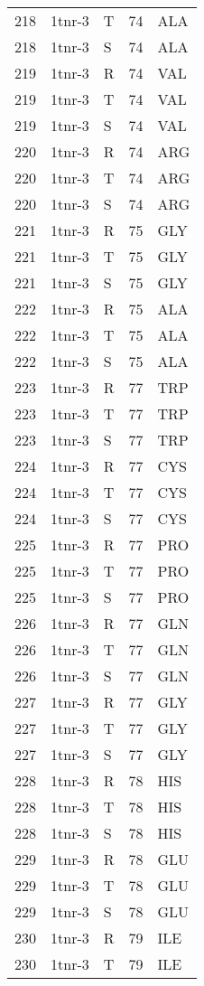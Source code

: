 \begin{longtable}[l]{l|l|l|l|l}
	218 & 1tnr-3 & T & 74 & ALA \\
	218 & 1tnr-3 & S & 74 & ALA \\
	219 & 1tnr-3 & R & 74 & VAL \\
	219 & 1tnr-3 & T & 74 & VAL \\
	219 & 1tnr-3 & S & 74 & VAL \\
	220 & 1tnr-3 & R & 74 & ARG \\
	220 & 1tnr-3 & T & 74 & ARG \\
	220 & 1tnr-3 & S & 74 & ARG \\
	221 & 1tnr-3 & R & 75 & GLY \\
	221 & 1tnr-3 & T & 75 & GLY \\
	221 & 1tnr-3 & S & 75 & GLY \\
	222 & 1tnr-3 & R & 75 & ALA \\
	222 & 1tnr-3 & T & 75 & ALA \\
	222 & 1tnr-3 & S & 75 & ALA \\
	223 & 1tnr-3 & R & 77 & TRP \\
	223 & 1tnr-3 & T & 77 & TRP \\
	223 & 1tnr-3 & S & 77 & TRP \\
	224 & 1tnr-3 & R & 77 & CYS \\
	224 & 1tnr-3 & T & 77 & CYS \\
	224 & 1tnr-3 & S & 77 & CYS \\
	225 & 1tnr-3 & R & 77 & PRO \\
	225 & 1tnr-3 & T & 77 & PRO \\
	225 & 1tnr-3 & S & 77 & PRO \\
	226 & 1tnr-3 & R & 77 & GLN \\
	226 & 1tnr-3 & T & 77 & GLN \\
	226 & 1tnr-3 & S & 77 & GLN \\
	227 & 1tnr-3 & R & 77 & GLY \\
	227 & 1tnr-3 & T & 77 & GLY \\
	227 & 1tnr-3 & S & 77 & GLY \\
	228 & 1tnr-3 & R & 78 & HIS \\
	228 & 1tnr-3 & T & 78 & HIS \\
	228 & 1tnr-3 & S & 78 & HIS \\
	229 & 1tnr-3 & R & 78 & GLU \\
	229 & 1tnr-3 & T & 78 & GLU \\
	229 & 1tnr-3 & S & 78 & GLU \\
	230 & 1tnr-3 & R & 79 & ILE \\
	230 & 1tnr-3 & T & 79 & ILE \\

\end{longtable}
